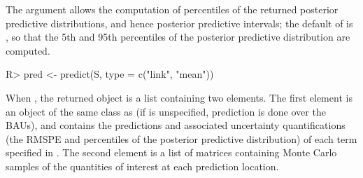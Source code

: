 \documentclass[nojss]{jss}
\begin{document}
The  argument allows the computation of percentiles of the returned posterior predictive distributions, and hence posterior predictive intervals; the default of  is , so that the 5th and 95th percentiles of the posterior predictive distribution are computed.
\begin{Code}
R> pred <- predict(S, type = c("link", "mean"))
\end{Code}
When , the returned object is a list containing two elements. 
The first element is an object of the same class as  (if  is unspecified, prediction is done over the BAUs), and contains the predictions and associated uncertainty quantifications (the RMSPE and percentiles of the posterior predictive distribution) of each term specified in .
The second element is a list of matrices containing Monte Carlo samples of the quantities of interest at each prediction location. 
\end{document}
